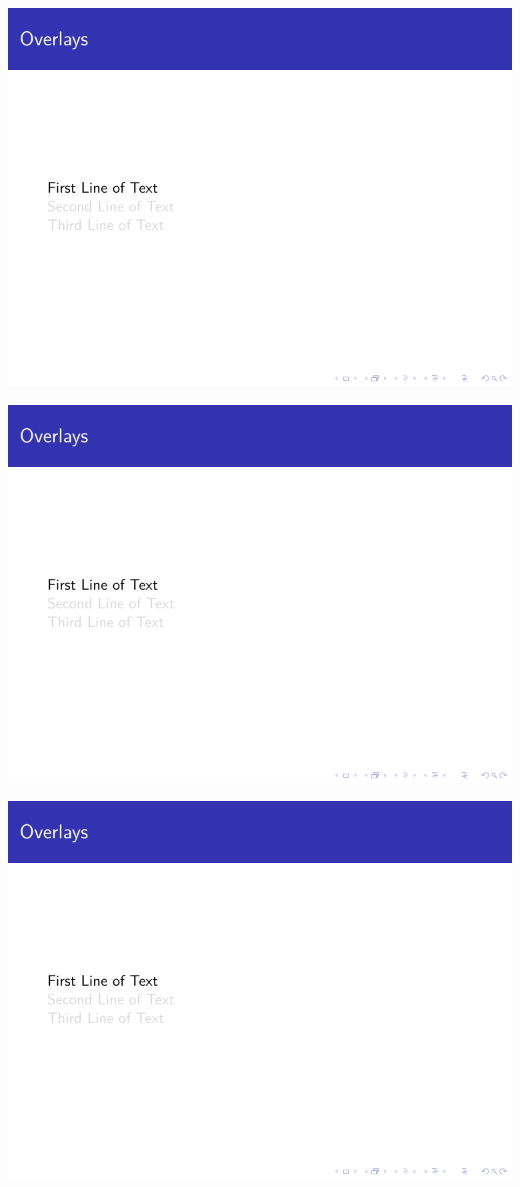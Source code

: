 \begin{column}{0.5\textwidth}
\includegraphics[page=1]{examples/beamer/overlay-transparent.pdf}

\includegraphics[page=2]{examples/beamer/overlay-transparent.pdf}

\includegraphics[page=3]{examples/beamer/overlay-transparent.pdf}


\end{column}
